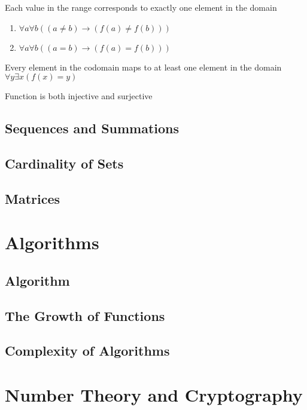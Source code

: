 \documentclass{article}
\begin{document}
\begin{definition}[Injectivity]
    Each value in the range corresponds to exactly one element in the domain
    \begin{enumerate}
	\item $ \forall a \forall b ((a \neq b) \rightarrow
	    (f(a) \neq f(b))) $
	\item $ \forall a \forall b ((a = b) \rightarrow (f(a) = f(b))) $
    \end{enumerate}
\end{definition}

\begin{definition}[Surjectivity]
    Every element in the codomain maps to at least one element in the domain
    $ \forall y \exists x (f(x)=y) $
\end{definition}

\begin{definition}[Bijectivity]
    Function is both injective and surjective
\end{definition}



\subsection{Sequences and Summations}
\subsection{Cardinality of Sets}
\subsection{Matrices}

\section{Algorithms}

\subsection{Algorithm}
\subsection{The Growth of Functions}
\subsection{Complexity of Algorithms}

\section{Number Theory and Cryptography}
\end{document}

